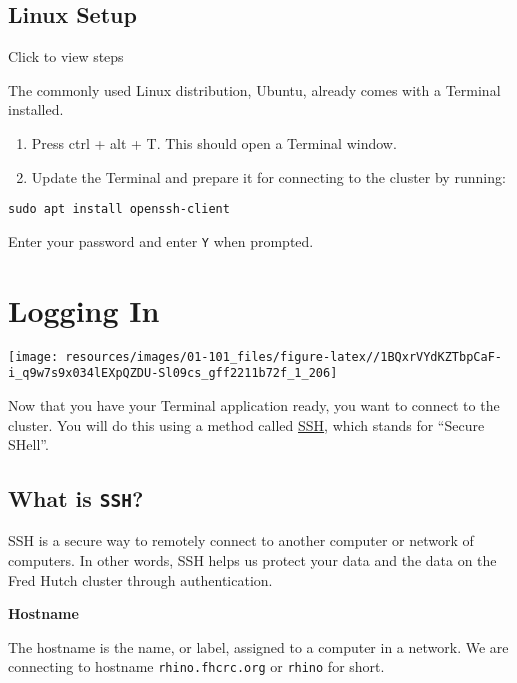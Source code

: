 \documentclass[
]{book}
\begin{document}
\hypertarget{linux}{%
\section{Linux Setup}\label{linux}}

Click to view steps

The commonly used Linux distribution, Ubuntu, already comes with a Terminal installed.

\begin{enumerate}
\def\labelenumi{\arabic{enumi}.}
\item
  Press ctrl + alt + T. This should open a Terminal window.
\item
  Update the Terminal and prepare it for connecting to the cluster by running:
\end{enumerate}

\begin{verbatim}
sudo apt install openssh-client
\end{verbatim}

Enter your password and enter \texttt{Y} when prompted.

\hypertarget{logging-in}{%
\chapter{Logging In}\label{logging-in}}

\begin{center}\texttt{[image: resources/images/01-101\_files/figure-latex//1BQxrVYdKZTbpCaF-i\_q9w7s9x034lEXpQZDU-Sl09cs\_gff2211b72f\_1\_206]} \end{center}

Now that you have your Terminal application ready, you want to connect to the cluster. You will do this using a method called \href{https://www.ssh.com/academy/ssh/protocol}{SSH}, which stands for ``Secure SHell''.

\hypertarget{what-is-ssh}{%
\section{\texorpdfstring{What is \texttt{SSH}?}{What is SSH?}}\label{what-is-ssh}}

SSH is a secure way to remotely connect to another computer or network of computers. In other words, SSH helps us protect your data and the data on the Fred Hutch cluster through authentication.

\textbf{Hostname}

The hostname is the name, or label, assigned to a computer in a network. We are connecting to hostname \texttt{rhino.fhcrc.org} or \texttt{rhino} for short.
\end{document}
